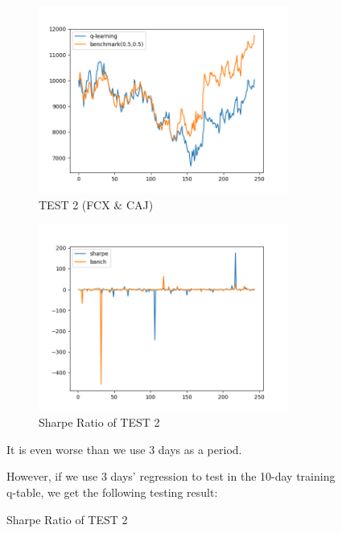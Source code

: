 \newpage
\begin{figure}[H]
\begin{subfigure}{.5\textwidth}%
\centering
\includegraphics[clip, width=0.9\textwidth]{Graphics/TESTFC10.png} \caption{TEST 2 (FCX \& CAJ)} 
\end{subfigure}%
\begin{subfigure}{.5\textwidth}%
\centering
\includegraphics[clip, width=0.9\textwidth]{Graphics/TESTFC10S.png} \caption{Sharpe Ratio of TEST 2}
\end{subfigure}%
\vspace{0.4cm}

It is even worse than we use 3 days as a period.

\vspace{0.4cm}

However, if we use 3 days’ regression to test in the 10-day training q-table, we get the following testing result:


\end{figure}
